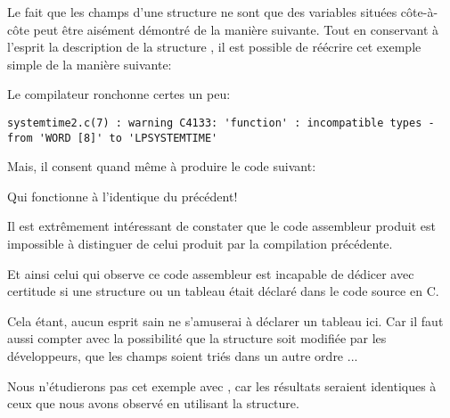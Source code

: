 Le fait que les champs d'une structure ne sont que des variables situées côte-à-côte peut être 
aisément démontré de la manière suivante.
Tout en conservant à l'esprit la description de la structure , il est possible de 
réécrire cet exemple simple de la manière suivante:



Le compilateur ronchonne certes un peu:

\begin{lstlisting}
systemtime2.c(7) : warning C4133: 'function' : incompatible types - from 'WORD [8]' to 'LPSYSTEMTIME'
\end{lstlisting}

Mais, il consent quand même à produire le code suivant:



Qui fonctionne à l'identique du précédent!

Il est extrêmement intéressant de constater que le code assembleur produit est impossible à 
distinguer de celui produit par la compilation précédente.

Et ainsi celui qui observe ce code assembleur est incapable de dédicer avec certitude si une 
structure ou un tableau était déclaré dans le code source en C. 

Cela étant, aucun esprit sain ne s'amuserai à déclarer un tableau ici. Car il faut aussi compter 
avec la possibilité que la structure soit modifiée par les développeurs, que les champs soient 
triés dans un autre ordre ...

Nous n'étudierons pas cet exemple avec \olly, car les résultats seraient identiques à ceux que nous 
avons observé en utilisant la structure.

